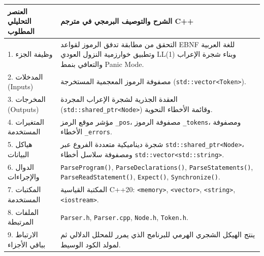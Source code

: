 \documentclass[11pt,a4paper,oneside]{report}
\begin{document}
\begin{longtable}{|p{4.2cm}|p{12.2cm}|}
\hline
\rowcolor{NavyBlue}\color{white}\textbf{\arabicfont العنصر التحليلي المطلوب} & \rowcolor{NavyBlue}\color{white}\textbf{\arabicfont الشرح والتوصيف البرمجي في مترجم C++} \\
\hline
\endhead
1. وظيفة الجزء & التحقق من مطابقة تدفق الرموز لقواعد EBNF للغة العربية وتطبيق خوارزمية النزول العودي LL(1) وبناء شجرة الإعراب والتعافي بنمط Panic Mode. \\
\hline
2. المدخلات (Inputs) & مصفوفة الرموز المعجمية المستخرجة (\texttt{std::vector<Token>}). \\
\hline
3. المخرجات (Outputs) & العقدة الجذرية لشجرة الإعراب المجردة (\texttt{std::shared\_ptr<Node>}) وقائمة الأخطاء النحوية. \\
\hline
4. المتغيرات المستخدمة & مؤشر موقع الرمز \texttt{\_pos}، مصفوفة الرموز \texttt{\_tokens}، ومصفوفة الأخطاء \texttt{\_errors}. \\
\hline
5. هياكل البيانات & شجرة ديناميكية متعددة الفروع عبر \texttt{std::shared\_ptr<Node>}، ومصفوفة سلاسل أخطاء \texttt{std::vector<std::string>}. \\
\hline
6. الدوال والإجراءات & \texttt{ParseProgram()}, \texttt{ParseDeclarations()}, \texttt{ParseStatements()}, \texttt{ParseReadStatement()}, \texttt{Expect()}, \texttt{Synchronize()}. \\
\hline
7. المكتبات المستخدمة & المكتبة القياسية C++20: \texttt{<memory>}, \texttt{<vector>}, \texttt{<string>}, \texttt{<iostream>}. \\
\hline
8. الملفات المرتبطة & \texttt{Parser.h}, \texttt{Parser.cpp}, \texttt{Node.h}, \texttt{Token.h}. \\
\hline
9. الارتباط بباقي الأجزاء & ينتج الهيكل الشجري الهرمي للبرنامج الذي يمرر للمحلل الدلالي ثم لمولد الكود الوسيط. \\
\hline
\end{longtable}
\end{document}
